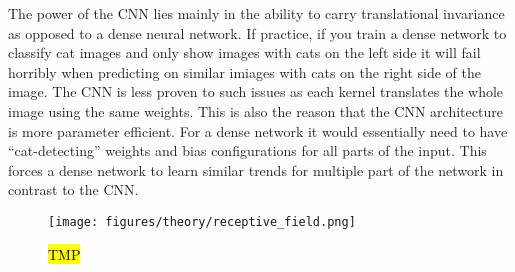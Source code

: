 The power of the \acrshort{CNN} lies mainly in the ability to carry
translational invariance as opposed to a dense neural network. If practice, if
you train a dense network to classify cat images and only show images with cats
on the left side it will fail horribly when predicting on similar imiages with
cats on the right side of the image. The \acrshort{CNN} is less proven to such
issues as each kernel translates the whole image using the same weights. This is
also the reason that the \acrshort{CNN} architecture is more parameter
efficient. For a dense network it would essentially need to have
``cat-detecting'' weights and bias configurations for all parts of the input.
This forces a dense network to learn similar trends for multiple part of the
network in contrast to the \acrshort{CNN}.



\begin{figure}[H]
  \centering
  \texttt{[image: figures/theory/receptive\_field.png]}
  \caption{\hl{TMP}}
  \label{fig:receptive_field}
\end{figure}

